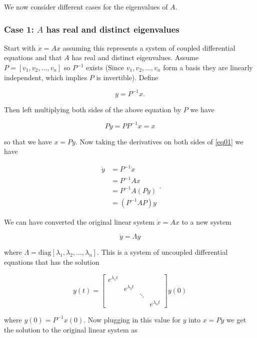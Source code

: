 \documentclass[12pt]{article}
\theoremstyle{definition}
\begin{document}
We now consider different cases for the eigenvalues of $A$.

\subsubsection{Case 1: $A$ has real and distinct eigenvalues}

Start with $\dot x = Ax$ assuming this represents a system of coupled differential equations and that $A$ has real and distinct eigenvalues. Assume $P = [v_1, v_2, \ldots, v_n]$ so $P^{-1}$ exists (Since $v_1, v_2, \ldots, v_n$ form a basis they are linearly independent, which implies $P$ is invertible). Define 

\begin{equation} \label{eq01}
y = P^{-1}x.
\end{equation}

Then left multiplying both sides of the above equation by $P$ we have

$$ Py = PP^{-1}x = x $$

so that we have $x = Py$. Now taking the derivatives on both sides of \eqref{eq01} we have

\begin{equation}
\begin{split}
\dot y &= P^{-1} \dot x \\
&= P^{-1} Ax \\
&= P^{-1}A (Py) \\
&= (P^{-1}AP)y
\end{split}
.
\end{equation}

We can have converted the original linear system $\dot x = Ax$ to a new system

$$\dot y = \Lambda y$$

where $\Lambda = \text{diag}[\lambda_1, \lambda_2, \ldots, \lambda_n]$. This is a system of uncoupled differential equations that has the solution

\begin{equation*}
y(t) =
\begin{bmatrix}
e^{\lambda_1 t} & & \\
& e^{\lambda_2 t} & \\
& & \ddots & \\
& & & e^{\lambda_n t}
\end{bmatrix}
y(0)
\end{equation*}

where $y(0) = P^{-1}x(0)$. Now plugging in this value for $y$ into $x = Py$ we get the solution to the original linear system as
\end{document}
